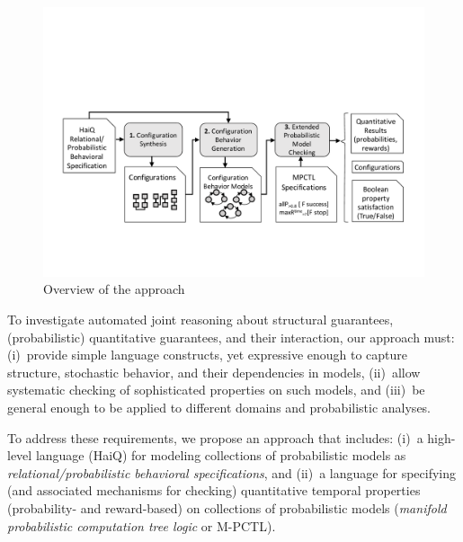 \documentclass[10pt,journal,compsoc]{IEEEtran}
\begin{document}
\begin{figure}[!hbt]
    \centering
    \includegraphics[width=\linewidth]{figures/overview}    
    \caption{Overview of the approach} %
    \label{fig:overview}      
    \vspace{-0.2cm}
\end{figure}




To investigate automated joint reasoning about structural guarantees, (probabilistic) quantitative guarantees, and their interaction, our approach must: (i)~provide simple language constructs, yet expressive enough to capture structure, stochastic behavior, and their dependencies in models, (ii)~allow systematic checking of sophisticated properties on such models, and (iii)~be general enough to be applied to different domains and probabilistic analyses. 




To address these requirements, we propose an approach that includes: (i)~a high-level language ({\sf HaiQ}) for modeling collections of probabilistic models as {\em relational/probabilistic behavioral specifications}, and (ii)~a language for specifying (and associated mechanisms for checking) quantitative temporal properties (probability- and reward-based) on collections of probabilistic models ({\em manifold probabilistic computation tree logic} or M-PCTL).
\end{document}
